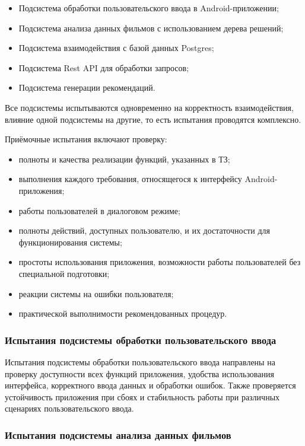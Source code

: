 \begin{itemize}
	\item Подсистема обработки пользовательского ввода в Android-приложении;
	\item Подсистема анализа данных фильмов с использованием дерева решений;
	\item Подсистема взаимодействия с базой данных Postgres;
	\item Подсистема Rest API для обработки запросов;
	\item Подсистема генерации рекомендаций.
\end{itemize}

Все подсистемы испытываются одновременно на корректность взаимодействия, влияние одной подсистемы на другие, то есть испытания проводятся комплексно.

Приёмочные испытания включают проверку:

\begin{itemize}
	\item полноты и качества реализации функций, указанных в ТЗ;
	\item выполнения каждого требования, относящегося к интерфейсу Android-приложения;
	\item работы пользователей в диалоговом режиме;
	\item полноты действий, доступных пользователю, и их достаточности для функционирования системы;
	\item простоты использования приложения, возможности работы пользователей без специальной подготовки;
	\item реакции системы на ошибки пользователя;
	\item практической выполнимости рекомендованных процедур.
\end{itemize}

\subsubsection{Испытания подсистемы обработки пользовательского ввода}

Испытания подсистемы обработки пользовательского ввода направлены на проверку доступности всех функций приложения, удобства использования интерфейса, корректного ввода данных и обработки ошибок. Также проверяется устойчивость приложения при сбоях и стабильность работы при различных сценариях пользовательского ввода.

\subsubsection{Испытания подсистемы анализа данных фильмов}

